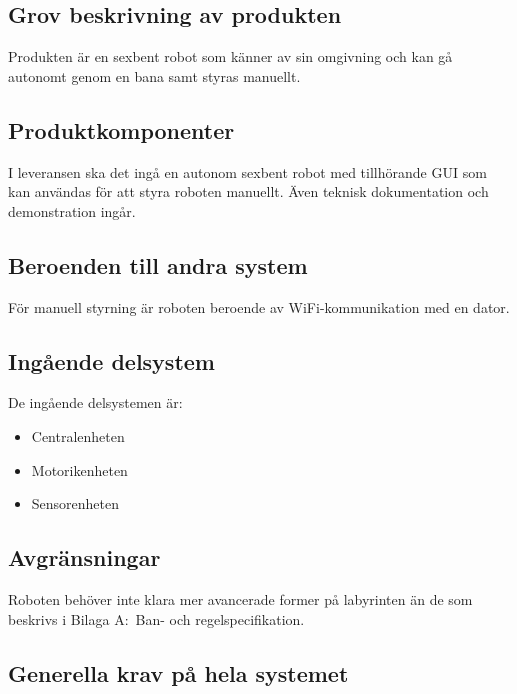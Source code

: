 \documentclass[a4paper,titlepage,12pt]{article}
\begin{document}
	\subsection{Grov beskrivning av produkten}
	Produkten är en sexbent robot som känner av sin omgivning och kan gå autonomt
	genom en bana samt styras manuellt.
	\subsection{Produktkomponenter}
	I leveransen ska det ingå en autonom sexbent robot med tillhörande GUI som kan användas för att 
	styra roboten manuellt. Även teknisk dokumentation och demonstration ingår. 
	\subsection{Beroenden  till andra system}
    För manuell styrning är roboten beroende av WiFi-kommunikation med en dator.
	\subsection{Ingående delsystem}
    De ingående delsystemen är:
    
    \begin{itemize}
        \item Centralenheten
        \item Motorikenheten
        \item Sensorenheten
    \end{itemize}
	\subsection{Avgränsningar}
	Roboten behöver inte klara mer avancerade former på labyrinten än de som beskrivs i Bilaga A:\ Ban- och regelspecifikation.
	\subsection{Generella krav på hela systemet}
\end{document}
